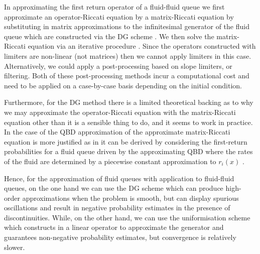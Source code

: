 
In approximating the first return operator of a fluid-fluid queue we first approximate an operator-Riccati equation by a matrix-Riccati equation by substituting in matrix approximations to the infinitesimal generator of the fluid queue which are constructed via the DG scheme \citep{blnos2022}. We then solve the matrix-Riccati equation via an iterative procedure \citep{bean2005b,blnos2022}. Since the operators constructed with limiters are non-linear (not matrices) then we cannot apply limiters in this case. Alternatively, we could apply a post-processing based on slope limiters, or filtering. Both of these post-processing methods incur a computational cost and need to be applied on a case-by-case basis depending on the initial condition. 

Furthermore, for the DG method there is a limited theoretical backing as to why we may approximate the operator-Riccati equation with the matrix-Riccati equation other than it is a sensible thing to do, and it seems to work in practice. In the case of the QBD approximation of \cite{bo2013} the approximate matrix-Riccati equation is more justified as in it can be derived by considering the first-return probabilities for a fluid queue driven by the approximating QBD where the rates of the fluid are determined by a piecewise constant approximation to \(r_i(x)\) \citep{bean2005}. 

Hence, for the approximation of fluid queues with application to fluid-fluid queues, on the one hand we can use the DG scheme which can produce high-order approximations when the problem is smooth, but can display spurious oscillations and result in negative probability estimates in the presence of discontinuities. While, on the other hand, we can use the uniformisation scheme which constructs in a linear operator to approximate the generator and guarantees non-negative probability estimates, but convergence is relatively slower. 

